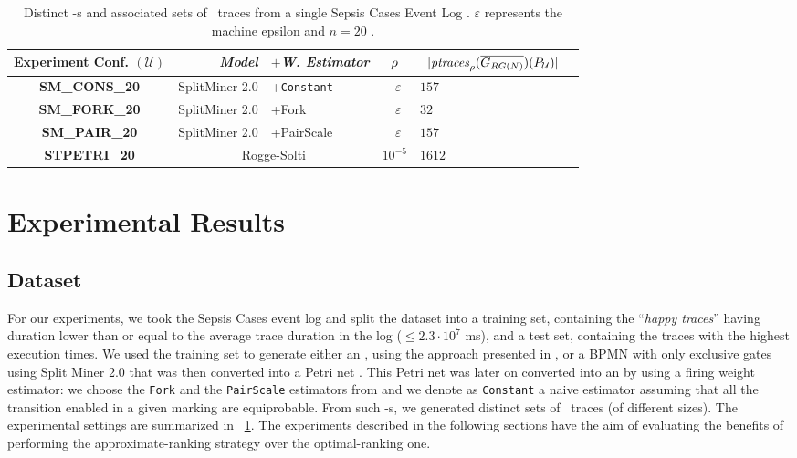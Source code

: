 \begin{table}[!t]
\caption{Distinct \uswn-s and associated sets of \unravelled\ traces from a single Sepsis Cases Event Log \cite{mannhardt_2016}. $\varepsilon$ represents the machine epsilon \ifdefined\WWITHN and $n=20$ \fi.}\label{tab:dataset}
\centering
 \begin{adjustbox}{width=.6\textwidth}
	\begin{tabular}{crl||cl|c}
		\toprule
		\textbf{Experiment Conf.} $(\mathcal{U})$ & \textit{Model} & $+$\textit{W. Estimator} & $\pmin$& $\;\;|\WCal{\pmin}{n}(P_{\mathcal{U}})|$ \\
		\midrule
		
		\textbf{SM\_CONS\_20} &SplitMiner 2.0  \cite{AugustoCDRP19}       & +\texttt{Constant} &  $\;\;\varepsilon$ & $157$  \\
		
		\textbf{SM\_FORK\_20} & SplitMiner 2.0  \cite{AugustoCDRP19}      & +Fork \cite{spdwe} &  $\;\;\varepsilon$ & $32$  \\
		
		
		\textbf{SM\_PAIR\_20} & SplitMiner 2.0  \cite{AugustoCDRP19}      & +PairScale \cite{spdwe} &  $\;\;\varepsilon$ & $157$ \\

		\textbf{STPETRI\_20} & \multicolumn{2}{c||}{Rogge-Solti \cite{RoggeSoltiAW13}} &  $10^{-5}$ & $1612$ \\
		\bottomrule
	\end{tabular}
\end{adjustbox}
\end{table}
\section{Experimental Results}\label{sec:exp}
\subsection{Dataset}
For our experiments, we took the Sepsis Cases event log \cite{mannhardt_2016} and split the dataset into a training set, containing the ``\textit{happy traces}''  having duration lower than or equal to the average trace duration in the log ($\leq 2.3\cdot 10^{7}$ ms), and a test set, containing the traces with the highest execution times. We used the training set to generate either an \uswn, using the approach presented in \cite{RoggeSoltiAW13}, or a BPMN with only exclusive gates using Split Miner 2.0 \cite{AugustoCDRP19} that was then converted into a Petri net \cite{PPNFromLog}. This Petri net was later on converted into an \uswn by using a firing weight estimator: we choose the \texttt{Fork} and the \texttt{PairScale} estimators from \cite{spdwe} and we denote as \texttt{Constant} a naive estimator assuming that all the transition enabled in a given marking are equiprobable. %
From such \uswn-s, we generated distinct sets of \unravelled\ traces (of different sizes). The experimental settings are summarized in \tablename~\ref{tab:dataset}. The experiments described in the following sections have the aim of evaluating the benefits of performing the approximate-ranking strategy over the optimal-ranking one.

